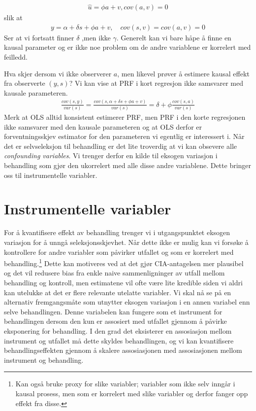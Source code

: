 \begin{align}
\hat{u}=\phi a + v, cov(a,v) = 0
\end{align}
slik at
\begin{align}
y =  \alpha+\delta s + \phi a + v, \quad cov(s,v)=cov(a,v)=0
\end{align}
Ser at vi fortsatt finner $\delta$ ,men ikke $\gamma$. Generelt kan vi bare håpe å finne en kausal parameter og er ikke noe problem om de andre variablene er korrelert med feilledd. 

Hva skjer dersom vi ikke observerer $a$, men likevel prøver å estimere kausal effekt fra observerte $(y,s)$? Vi kan vise at PRF i kort regresjon ikke samsvarer med kausale parameteren.
\begin{align}
\frac{cov(s,y)}{var(s)} = \frac{cov(s,\alpha + \delta s + \phi a + v)}{var(s)} = \delta + \phi \frac{cov(s,a)}{var(s)}
\end{align}
Merk at OLS alltid konsistent estimerer PRF, men PRF i den korte regresjonen ikke samsvarer med den kausale parameteren og at OLS derfor er forventningsskjev estimator for den parameteren vi egentlig er interessert i. Når det er selvseleksjon til behandling er det lite troverdig at vi kan obsevere alle \textit{confounding variables}. Vi trenger derfor en kilde til eksogen variasjon i behandling som gjør den ukorrelert med alle disse andre variablene. Dette bringer oss til instrumentelle variabler.
\section{Instrumentelle variabler}
For å kvantifisere effekt av behandling trenger vi i utgangspunktet eksogen variasjon for å unngå seleksjonsskjevhet. Når dette ikke er mulig kan vi forsøke å kontrollere for andre variabler som påvirker utfallet og som er korrelert med behandling.\footnote{Kan også bruke proxy for slike variabler; variabler som ikke selv inngår i kausal prosess, men som er korrelert med slike variabler og derfor fanger opp effekt fra disse.} Dette kan motiveres ved at det gjør CIA-antagelsen mer plausibel og det vil redusere bias fra enkle naive sammenligninger av utfall mellom behandling og kontroll, men estimatene vil ofte være lite kredible siden vi aldri kan utelukke at det er flere relevante utelatte variabler. Vi skal nå se på en alternativ fremgangsmåte som utnytter eksogen variasjon i en annen variabel enn selve behandlingen. Denne variabelen kan fungere som et instrument for behandlingen dersom den kun er assosiert med utfallet gjennom å påvirke eksponering for behandling. I den grad det eksisterer en assosiasjon mellom instrument og utfallet må dette skyldes behandlingen, og vi kan kvantifisere behandlingseffekten gjennom å skalere assosiasjonen med assosiasjonen mellom instrument og behandling.

